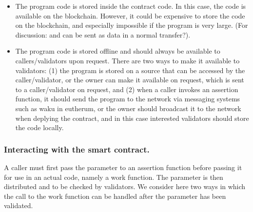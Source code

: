 \documentclass[runningheads]{llncs}
\begin{document}
\begin{itemize} 
\item The program code is stored inside the contract code. In this case, the code is available on the blockchain. However, it could be expensive to store the code on the blockchain, and especially impossible if the program is very large. (For discussion: and can be sent as data in a normal transfer?). 
\item The program code is stored offline and should always be available to callers/validators upon request. There are two ways to make it available to validators: (1) the program is stored on a source that can be accessed by the caller/validator, or the owner can make it available on request, which is sent to a caller/validator on request, and (2) when a caller invokes an assertion function, it should send the program to the network via messaging systems such as waku in eutherum, or the owner should broadcast it to the network when deplying the contract, and in this case interested validators should store the code locally. \end{itemize}



\subsubsection{Interacting with the smart contract.}
A caller must first pass the parameter to an assertion function before passing it for use in an actual code, namely a work function. The parameter is then distributed and to be checked by validators. We consider here two ways in which the call to the work function can be handled after the parameter has been validated.
\end{document}
